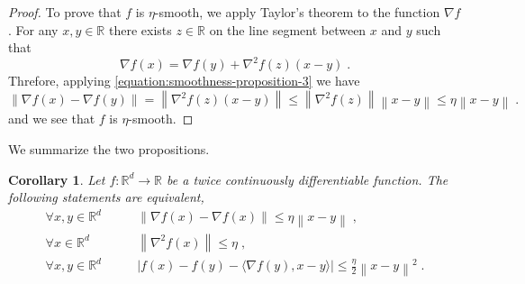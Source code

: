 \documentclass[12pt]{article}
\newtheorem{corollary}[definition]{Corollary}
\newcommand{\R}{\mathbb{R}}
\newcommand{\grad}{\nabla}
\newcommand{\norm}[1]{\left\|#1\right\|}
\begin{document}
\begin{proof}
To prove that $f$ is $\eta$-smooth, we apply Taylor's theorem to
the function $\grad f$. For any $x,y \in \R$ there exists $z \in \R$
on the line segment between $x$ and $y$ such that
$$
\grad f(x) = \grad f(y) + \grad^2 f(z) (x - y) \; .
$$
Threfore, applying \eqref{equation:smoothness-proposition-3} we have
$$
\norm{\grad f(x) - \grad f(y)} = \norm{\grad^2 f(z) (x - y)} \le \norm{\grad^2 f(z)} \norm{x - y} \le \eta \norm{x - y} \; .
$$
and we see that $f$ is $\eta$-smooth.
\end{proof}

We summarize the two propositions.

\begin{corollary}
Let $f:\R^d \to \R$ be a twice continuously differentiable function. The following statements
are equivalent,
\begin{align*}
\forall x,y \in \R^d \qquad & \norm{\grad f(x) - \grad f(x)} \le \eta \norm{x - y} \; , \\
\forall x \in \R^d \qquad & \norm{\grad^2 f(x)} \le \eta \; , \\
\forall x,y \in \R^d \qquad & \left| f(x) - f(y) - \langle \grad f(y), x - y \rangle \right| \le \frac{\eta}{2} \norm{x - y}^2 \; .
\end{align*}

\end{corollary}
\end{document}
